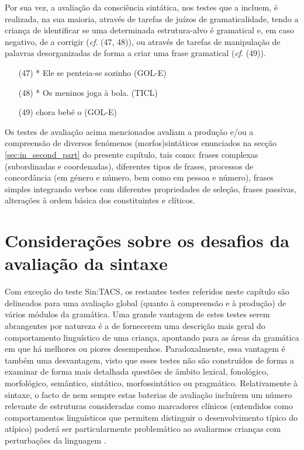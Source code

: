 \documentclass[output=paper,colorlinks,citecolor=brown,booklanguage=portuguese]{langscibook}
\begin{document}
Por sua vez, a avaliação da consciência sintática, nos testes que a incluem, é realizada, na sua maioria, através de tarefas de juízos de gramaticalidade, tendo a criança de identificar se uma determinada estrutura-alvo é gramatical e, em caso negativo, de a corrigir (\emph{cf}. (47, 48)), ou através de tarefas de manipulação de palavras desorganizadas de forma a criar uma frase gramatical (\emph{cf}. (49)).

\begin{enumerate}[align=left]
    \item [(47)] 	* Ele se penteia-se sozinho (GOL-E)
\item[(48)] 	* Os meninos joga à bola. (TICL)
\item[(49)] 	chora bebé o (GOL-E)
\end{enumerate}

Os testes de avaliação acima mencionados avaliam a produção e/ou a compreensão de diversos fenómenos (morfos)sintáticos enunciados na secção \ref{sec:in_second_part} do presente capítulo, tais como: frases complexas (subordinadas e coordenadas), diferentes tipos de frases, processos de concordância (em género e número, bem como em pessoa e número), frases simples integrando verbos com diferentes propriedades de seleção, frases passivas, alterações à ordem básica dos constituintes e clíticos.

\section{Considerações sobre os desafios da avaliação da sintaxe}
Com exceção do teste Sin:TACS, os restantes testes referidos neste capítulo são delineados para uma avaliação global (quanto à compreensão e à produção) de vários módulos da gramática.  Uma grande vantagem de estes testes serem abrangentes por natureza é a de fornecerem uma descrição mais geral do comportamento linguístico de uma criança, apontando para as áreas da gramática em que há melhores ou piores desempenhos. Paradoxalmente, essa vantagem é também uma desvantagem, visto que esses testes não são construídos de forma a examinar de forma mais detalhada questões de âmbito lexical, fonológico, morfológico, semântico, sintático, morfossintático ou pragmático. Relativamente à sintaxe, o facto de nem sempre estas baterias de avaliação incluírem um número relevante de estruturas consideradas como marcadores clínicos (entendidos como comportamentos linguísticos que permitem distinguir o desenvolvimento típico do atípico) poderá ser particularmente problemático ao avaliarmos crianças com perturbações da linguagem \citep{Afonso2011}. 
\end{document}
